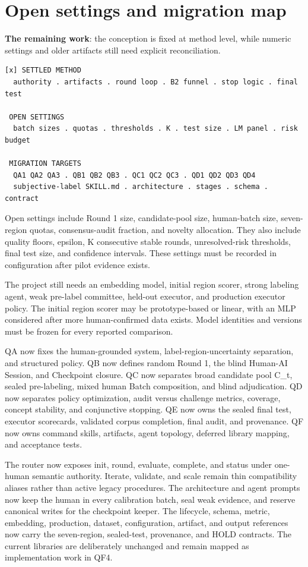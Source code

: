 \section{Open settings and migration map}
\textbf{The remaining work}: the conception is fixed at method level, while numeric settings and older artifacts still need explicit reconciliation.

\begin{verbatim}
[x] SETTLED METHOD
  authority . artifacts . round loop . B2 funnel . stop logic . final test

 OPEN SETTINGS
  batch sizes . quotas . thresholds . K . test size . LM panel . risk budget

 MIGRATION TARGETS
  QA1 QA2 QA3 . QB1 QB2 QB3 . QC1 QC2 QC3 . QD1 QD2 QD3 QD4
  subjective-label SKILL.md . architecture . stages . schema . contract
\end{verbatim}
Open settings include Round 1 size, candidate-pool size, human-batch size, seven-region quotas, consensus-audit fraction, and novelty allocation. They also include quality floors, epsilon, K consecutive stable rounds, unresolved-risk thresholds, final test size, and confidence intervals. These settings must be recorded in configuration after pilot evidence exists.

The project still needs an embedding model, initial region scorer, strong labeling agent, weak pre-label committee, held-out executor, and production executor policy. The initial region scorer may be prototype-based or linear, with an MLP considered after more human-confirmed data exists. Model identities and versions must be frozen for every reported comparison.

QA now fixes the human-grounded system, label-region-uncertainty separation, and structured policy. QB now defines random Round 1, the blind Human-AI Session, and Checkpoint closure. QC now separates broad candidate pool C_t, sealed pre-labeling, mixed human Batch composition, and blind adjudication. QD now separates policy optimization, audit versus challenge metrics, coverage, concept stability, and conjunctive stopping. QE now owns the sealed final test, executor scorecards, validated corpus completion, final audit, and provenance. QF now owns command skills, artifacts, agent topology, deferred library mapping, and acceptance tests.

The router now exposes init, round, evaluate, complete, and status under one-human semantic authority. Iterate, validate, and scale remain thin compatibility aliases rather than active legacy procedures. The architecture and agent prompts now keep the human in every calibration batch, seal weak evidence, and reserve canonical writes for the checkpoint keeper. The lifecycle, schema, metric, embedding, production, dataset, configuration, artifact, and output references now carry the seven-region, sealed-test, provenance, and HOLD contracts. The current libraries are deliberately unchanged and remain mapped as implementation work in QF4.

